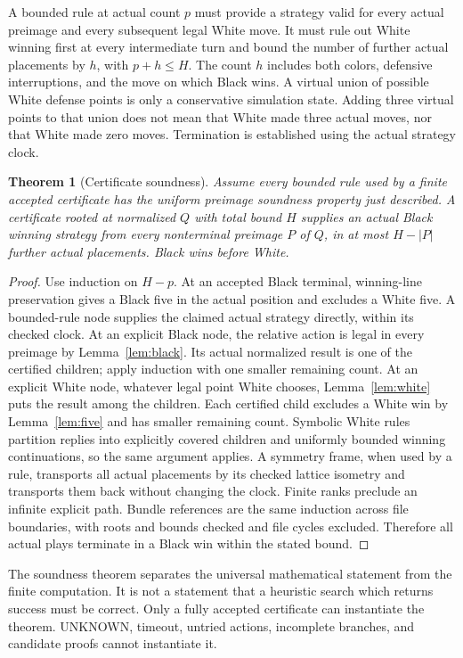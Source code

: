 \documentclass[11pt]{article}
\newtheorem{theorem}{Theorem}[section]
\theoremstyle{definition}
\theoremstyle{remark}
\begin{document}
A bounded rule at actual count $p$ must provide a strategy valid for every
actual preimage and every subsequent legal White move. It must rule out
White winning first at every intermediate turn and bound the number of
further actual placements by $h$, with $p+h\leq H$. The count $h$ includes
both colors, defensive interruptions, and the move on which Black wins.
A virtual union of possible White defense points is only a conservative
simulation state. Adding three virtual points to that union does not mean
that White made three actual moves, nor that White made zero moves.
Termination is established using the actual strategy clock.

\begin{theorem}[Certificate soundness]
\label{thm:sound}
Assume every bounded rule used by a finite accepted certificate has the
uniform preimage soundness property just described. A certificate rooted
at normalized $Q$ with total bound $H$ supplies an actual Black winning
strategy from every nonterminal preimage $P$ of $Q$, in at most $H-|P|$
further actual placements. Black wins before White.
\end{theorem}
\begin{proof}
Use induction on $H-p$. At an accepted Black terminal, winning-line
preservation gives a Black five in the actual position and excludes a
White five. A bounded-rule node supplies the claimed actual strategy
directly, within its checked clock. At an explicit Black node, the relative
action is legal in every preimage by Lemma~\ref{lem:black}. Its actual
normalized result is one of the certified children; apply induction with
one smaller remaining count. At an explicit White node, whatever legal
point White chooses, Lemma~\ref{lem:white} puts the result among the
children. Each certified child excludes a White win by
Lemma~\ref{lem:five} and has smaller remaining count. Symbolic White rules
partition replies into explicitly covered children and uniformly bounded
winning continuations, so the same argument applies. A symmetry frame,
when used by a rule, transports all actual placements by its checked
lattice isometry and transports them back without changing the clock.
Finite ranks preclude an infinite explicit path. Bundle references are
the same induction across file boundaries, with roots and bounds checked
and file cycles excluded. Therefore all actual plays terminate in a
Black win within the stated bound.
\end{proof}

The soundness theorem separates the universal mathematical statement from
the finite computation. It is not a statement that a heuristic search
which returns success must be correct. Only a fully accepted certificate
can instantiate the theorem. UNKNOWN, timeout, untried actions, incomplete
branches, and candidate proofs cannot instantiate it.
\end{document}
